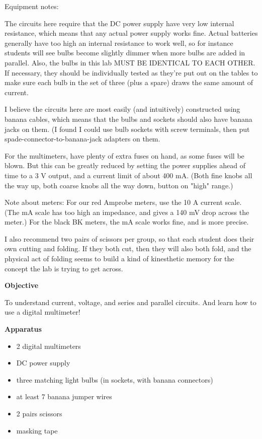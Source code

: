 {Equipment notes: 

The circuits here require that the DC power supply have very low internal resistance, which means that any actual power supply works fine.  Actual batteries generally have too high an internal resistance to work well, so for instance students will see bulbs become slightly dimmer when more bulbs are added in parallel. Also, the bulbs in this lab MUST BE IDENTICAL TO EACH OTHER.  If necessary, they should be individually tested as they're put out on the tables to make sure each bulb in the set of three (plus a spare) draws the same amount of current. 

I believe the circuits here are most easily (and intuitively) constructed using banana cables, which means that the bulbs and sockets should also have banana jacks on them.  (I found I could use bulb sockets with screw terminals, then put spade-connector-to-banana-jack adapters on them.

For the multimeters, have plenty of extra fuses on hand, as some fuses will be blown.  But this can be greatly reduced by setting the power supplies ahead of time to a 3 V output, and a current limit of about 400 mA.  (Both fine knobs all the way up, both coarse knobs all the way down, button on "high" range.)

Note about meters: For our red Amprobe meters, use the 10 A current scale.  (The mA scale has too high an impedance, and gives a 140 mV drop across the meter.)  For the black BK meters, the mA scale works fine, and is more precise.

I also recommend two pairs of scissors per group, so that each student does their own cutting and folding.  If they both cut, then they will also both fold, and the physical act of folding seems to build a kind of kinesthetic memory for the concept the lab is trying to get across.


}

\makelabheader %

\bigskip
\textbf{Objective}

To understand current, voltage, and series and parallel circuits.  And learn how to use a digital multimeter!

\bigskip
\textbf{Apparatus}

\begin{itemize}[nosep]
\item 2 digital multimeters 
\item DC power supply 
\item three matching light bulbs (in sockets, with banana connectors)
\item at least 7 banana jumper wires 
\item 2 pairs scissors
\item masking tape
\end{itemize}

